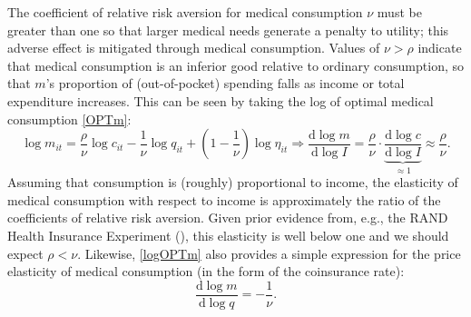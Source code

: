 \documentclass[12pt,pdftex,letterpaper]{article}
\newcommand{\der}[2]{\frac{\text{d}#1}{\text{d}#2}}
\newcommand{\Inc}{I}
\newcommand{\Con}{c}
\newcommand{\Care}{m}
\newcommand{\Copay}{q}
\newcommand{\CRRAcon}{\rho}
\newcommand{\CRRAcare}{\nu}
\newcommand{\MedShk}{\eta}
\begin{document}
The coefficient of relative risk aversion for medical consumption $\CRRAcare$ must be greater than one so that larger medical needs generate a penalty to utility; this adverse effect is mitigated through medical consumption.  Values of $\CRRAcare > \CRRAcon$ indicate that medical consumption is an inferior good relative to ordinary consumption, so that $\Care$'s proportion of (out-of-pocket) spending falls as income or total expenditure increases.  This can be seen by taking the log of optimal medical consumption \eqref{OPTm}:
\begin{equation}\label{logOPTm}
\log \Care_{it} = \frac{\CRRAcon}{\CRRAcare} \log \Con_{it} - \frac{1}{\CRRAcare} \log \Copay_{it} + \left(1 - \frac{1}{\CRRAcare} \right) \log \MedShk_{it} \Longrightarrow \der{\log \Care}{\log \Inc} = \frac{\CRRAcon}{\CRRAcare} \cdot \underbrace{\der{\log \Con}{\log \Inc}}_{\approx 1} \approx \frac{\CRRAcon}{\CRRAcare}.
\end{equation}
Assuming that consumption is (roughly) proportional to income, the elasticity of medical consumption with respect to income is approximately the ratio of the coefficients of relative risk aversion.  Given prior evidence from, e.g., the RAND Health Insurance Experiment (\cite{newhouse87}), this elasticity is well below one and we should expect $\CRRAcon < \CRRAcare$.  Likewise, \eqref{logOPTm} also provides a simple expression for the price elasticity of medical consumption (in the form of the coinsurance rate):
\begin{equation}
\der{\log \Care}{\log \Copay} = -\frac{1}{\CRRAcare}.
\end{equation}
\end{document}
